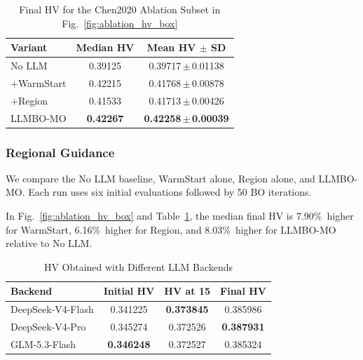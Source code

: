 \documentclass[lettersize,journal]{IEEEtran}
\newcommand{\AblationBaselineMean}{0.39717}
\newcommand{\AblationBaselineStd}{0.01138}
\newcommand{\AblationBaselineMedian}{0.39125}
\newcommand{\AblationWarmMean}{0.41768}
\newcommand{\AblationWarmStd}{0.00878}
\newcommand{\AblationWarmMedian}{0.42215}
\newcommand{\AblationWarmMedianPct}{7.90\%}
\newcommand{\AblationRegionMean}{0.41713}
\newcommand{\AblationRegionStd}{0.00426}
\newcommand{\AblationRegionMedian}{0.41533}
\newcommand{\AblationRegionMedianPct}{6.16\%}
\newcommand{\AblationFullMean}{0.42258}
\newcommand{\AblationFullStd}{0.00039}
\newcommand{\AblationFullMedian}{0.42267}
\newcommand{\AblationFullMedianPct}{8.03\%}
\begin{document}
\begin{table}[!t]

\caption{Final HV for the Chen2020 Ablation Subset in Fig.~\ref{fig:ablation_hv_box}}
\label{tab:ablation}
\centering
\footnotesize
\setlength{\tabcolsep}{3.5pt}
\begin{tabular}{@{}lcc@{}}
\toprule
Variant & Median HV & Mean HV $\pm$ SD \\
\midrule
No LLM & \AblationBaselineMedian & \AblationBaselineMean\,$\pm$\,\AblationBaselineStd \\
+WarmStart & \AblationWarmMedian & \AblationWarmMean\,$\pm$\,\AblationWarmStd \\
+Region & \AblationRegionMedian & \AblationRegionMean\,$\pm$\,\AblationRegionStd \\
LLMBO-MO & \textbf{\AblationFullMedian} & \textbf{\AblationFullMean\,$\pm$\,\AblationFullStd} \\
\bottomrule
\end{tabular}
\end{table}

\subsubsection{Regional Guidance}

We compare the No LLM baseline, WarmStart alone, Region alone, and
LLMBO-MO. Each run uses six initial evaluations followed by 50 BO
iterations.

In Fig.~\ref{fig:ablation_hv_box} and Table~\ref{tab:ablation}, the
median final HV is \AblationWarmMedianPct\ higher for WarmStart,
\AblationRegionMedianPct\ higher for Region, and \AblationFullMedianPct\
higher for LLMBO-MO relative to No LLM.

\begin{table}[!t]

\caption{HV Obtained with Different LLM Backends}

\label{tab:llm_backends}

\centering

\footnotesize

\setlength{\tabcolsep}{4.5pt}

\begin{tabular}{@{}lccc@{}}

\toprule

Backend & Initial HV & HV at 15 & Final HV \\

\midrule

DeepSeek-V4-Flash & 0.341225 & \textbf{0.373845} & 0.385986 \\

DeepSeek-V4-Pro & 0.345274 & 0.372526 & \textbf{0.387931} \\

GLM-5.3-Flash & \textbf{0.346248} & 0.372527 & 0.385324 \\

\bottomrule

\end{tabular}

\end{table}
\end{document}
